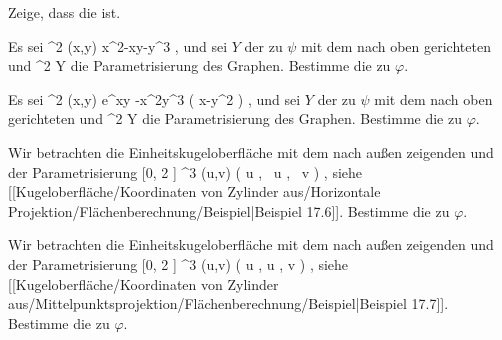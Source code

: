 \setcounter{section}{19}


{}
{

Zeige, dass die
ist.

}
{} {}

{}
{

Es sei
\maabbeledisp {\psi} {\R^2} {\R
} {(x,y)} { x^2-xy-y^3
} {,}
und sei $Y$ der
zu $\psi$ mit dem nach oben gerichteten
und
 {\R^2} {Y
} {}
die Parametrisierung des Graphen. Bestimme die
zu $\varphi$.

}
{} {}

{}
{

Es sei
\maabbeledisp {\psi} {\R^2} {\R
} {(x,y)} { e^{xy} -x^2y^3  \sin  \left(  x-y^2 \right)
} {,}
und sei $Y$ der
zu $\psi$ mit dem nach oben gerichteten
und
 {\R^2} {Y
} {}
die Parametrisierung des Graphen. Bestimme die
zu $\varphi$.

}
{} {}

{}
{

Wir betrachten die Einheitskugeloberfläche mit dem nach außen zeigenden
und der Parametrisierung
\maabbeledisp {\varphi} {[0, 2 \pi] \times [-1,1]} {\R^3
} {(u,v)} { \left(    \cos  u   , \,     \sin  u  , \,   v                 \right)
} {,}
siehe
[[Kugeloberfläche/Koordinaten von Zylinder aus/Horizontale Projektion/Flächenberechnung/Beispiel|Beispiel 17.6]].
Bestimme die
zu $\varphi$.

}
{} {}

{}
{

Wir betrachten die Einheitskugeloberfläche mit dem nach außen zeigenden
und der Parametrisierung
\maabbeledisp {\varphi} {[0, 2 \pi] \times \R} {\R^3
} {(u,v)} { {  }  ( \cos  u  ,  \sin  u  , v )
} {,}
siehe
[[Kugeloberfläche/Koordinaten von Zylinder aus/Mittelpunktsprojektion/Flächenberechnung/Beispiel|Beispiel 17.7]].
Bestimme die
zu $\varphi$.

}
{} {}

